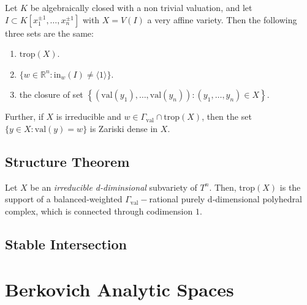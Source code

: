     \begin{theorem}
        Let $K$ be algebraically closed with a non trivial valuation, and let $I \subset K[x_1^{\pm 1}, \dots, x_n^{\pm 1}]$ with $X = V(I)$ a very affine variety. 
        Then the following three sets are the same:
        \begin{enumerate}
            \item $\text{trop}(X)$.
            \item $\{w \in \mathbb{R}^{n}: \text{in}_{w}(I) \neq \langle 1\rangle\}$. 
            \item the closure of set $\left\{(\text{val}(y_1), \dots, \text{val}(y_n)): (y_1,\dots, y_n) \in X\right\}$.
        \end{enumerate}
        Further, if $X$ is irreducible and $w \in \Gamma_{\text{val}} \cap \text{trop}(X)$, then the set $\{y \in X: \text{val}(y) = w\}$ is Zariski dense in $X$.
    \end{theorem}
\subsection{Structure Theorem}
    \begin{theorem}
        Let $X$ be an \textit{irreducible d-diminsional} subvariety of $T^{n}$. Then, trop$(X)$ is the support of a balanced-weighted $\Gamma_{\text{val}}-$rational purely d-dimensional polyhedral complex, which is connected through codimension $1$.
    \end{theorem}
\subsection{Stable Intersection}

\section{Berkovich Analytic Spaces}
